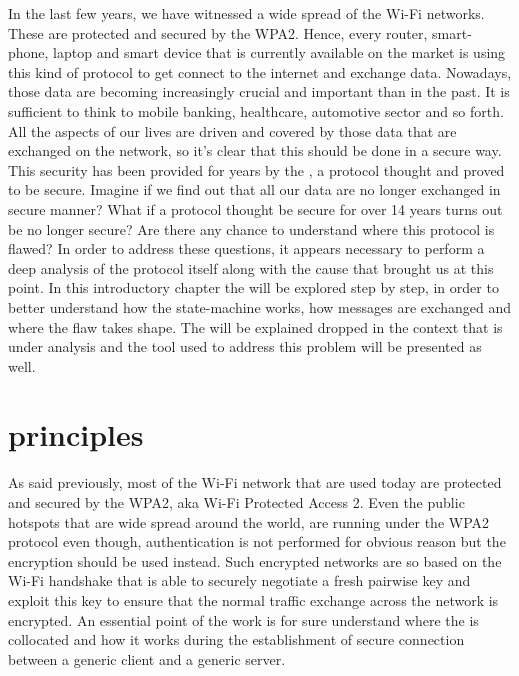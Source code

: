 
In the last few years, we have witnessed a wide spread of the Wi-Fi networks. These are protected and secured by the WPA2.
Hence, every router, smart-phone, laptop and smart device that is currently available on the market is using this kind of protocol to get connect to the internet and exchange data.
Nowadays, those data are becoming increasingly crucial and important than in the past. It is sufficient to think to mobile banking, healthcare, automotive sector and so forth.
All the aspects of our lives are driven and covered by those data that are exchanged on the network, so it's clear that this should be done in a secure way. This security has been provided 
for years by the \fwh, a protocol thought and proved to be secure.
Imagine if we find out that all our data are no longer exchanged in secure manner? What if a protocol thought be secure for over 14 years turns out be no longer secure? 
Are there any chance to understand where this protocol is flawed?
In order to address these questions, it appears necessary to perform a deep analysis of the protocol itself along with the cause that brought us at this point.
In this introductory chapter the \fwh will be explored step by step, in order to better understand how the state-machine works, how messages are exchanged and where 
the flaw takes shape. The \krack will be explained dropped in the context that is under analysis and the tool used to address this problem will be presented as well.




\section{\fwh principles} %

As said previously, most of the Wi-Fi network that are used today are protected and secured by the WPA2, aka Wi-Fi Protected Access 2.
Even the public hotspots that are wide spread around the world, are running under the WPA2 protocol even though,
authentication is not performed for obvious reason but the encryption should be used instead. Such encrypted networks are so based on the Wi-Fi handshake that is able 
to securely negotiate a fresh pairwise key and exploit this key to ensure that the normal traffic exchange across the network is encrypted.
An essential point of the work is for sure understand where the \fwh is collocated and how it works during the establishment of secure connection
between a generic client and a generic server.


